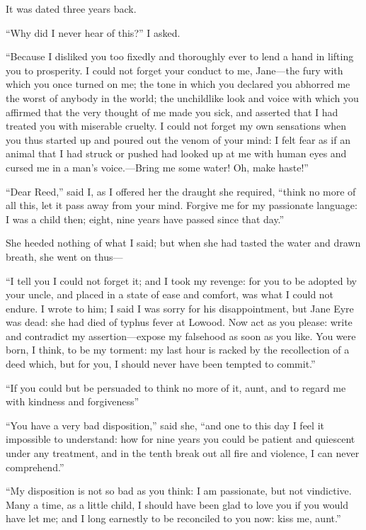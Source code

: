 It was dated three years back.

\enquote{Why did I never hear of this?} I asked.

\enquote{Because I disliked you too fixedly and thoroughly ever to lend
a hand in lifting you to prosperity. I could not forget your conduct to
me, Jane---the fury with which you once turned on me; the tone in which
you declared you abhorred me the worst of anybody in the world; the
unchildlike look and voice with which you affirmed that the very thought
of me made you sick, and asserted that I had treated you with miserable
cruelty. I could not forget my own sensations when you thus started up
and poured out the venom of your mind: I felt fear as if an animal that
I had struck or pushed had looked up at me with human eyes and cursed me
in a man's voice.---Bring me some water! Oh, make haste!}

\enquote{Dear \Mrs{} Reed,} said I, as I offered her the draught she
required, \enquote{think no more of all this, let it pass away from your
mind. Forgive me for my passionate language: I was a child then; eight,
nine years have passed since that day.}

She heeded nothing of what I said; but when she had tasted the water and
drawn breath, she went on thus---

\enquote{I tell you I could not forget it; and I took my revenge: for
you to be adopted by your uncle, and placed in a state of ease and
comfort, was what I could not endure. I wrote to him; I said I was
sorry for his disappointment, but Jane Eyre was dead: she had died of
typhus fever at Lowood. Now act as you please: write and contradict my
assertion---expose my falsehood as soon as you like. You were born, I
think, to be my torment: my last hour is racked by the recollection of a
deed which, but for you, I should never have been tempted to commit.}

\enquote{If you could but be persuaded to think no more of it, aunt, and
to regard me with kindness and forgiveness}

\enquote{You have a very bad disposition,} said she, \enquote{and one to
this day I feel it impossible to understand: how for nine years you
could be patient and quiescent under any treatment, and in the tenth
break out all fire and violence, I can never comprehend.}

\enquote{My disposition is not so bad as you think: I am passionate, but
not vindictive. Many a time, as a little child, I should have been glad
to love you if you would have let me; and I long earnestly to be
reconciled to you now: kiss me, aunt.}

